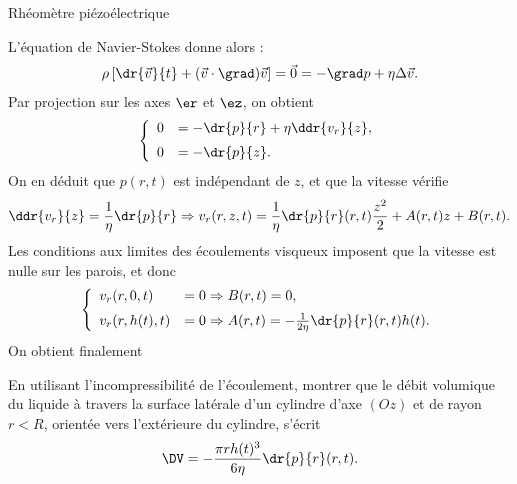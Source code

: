 \begin{exo}[PC][3][TD]{Rhéomètre piézoélectrique}
\begin{quest}
{L'équation de Navier-Stokes donne alors :
$$
\rho \left[ \dr{\Vec{v}}{t} + (\Vec{v} \cdot \grad) \Vec{v} \right] = \Vec{0} =  -\grad p + \eta \Delta \Vec{v}.
$$
Par projection sur les axes $\er$ et $\ez$, on obtient
$$
\left\{
\begin{array}{ll}
  0 & = -\dr{p}{r} + \eta \ddr{v_r}{z}, \\[2mm]
  0 & = -\dr{p}{z}. \\
\end{array}
\right.
$$
On en déduit que $p(r,t)$ est indépendant de $z$, et que la vitesse vérifie
$$
\ddr{v_r}{z} = \frac{1}{\eta} \dr{p}{r} \Rightarrow v_r(r,z,t) = \frac{1}{\eta} \dr{p}{r}(r,t) \frac{z^2}{2} + A(r,t) z + B(r,t).
$$
Les conditions aux limites des écoulements visqueux imposent que la vitesse est nulle sur les parois, et donc
$$
  \left\{
\begin{array}{ll}
    v_r(r,0,t) & = 0 \Rightarrow B(r,t) = 0, \\[2mm]
    v_r(r,h(t),t) & = 0 \Rightarrow A(r,t) = -\frac{1}{2\eta} \dr{p}{r}(r,t) h(t).
\end{array}
\right.
$$
On obtient finalement
}
\item En utilisant l'incompressibilité de l'écoulement, montrer que le débit volumique du liquide à travers la surface latérale d’un cylindre d'axe $(Oz)$ et de rayon $r < R$, orientée vers l'extérieure du cylindre, s'écrit 
\begin{equation}
\DV=-\frac{\pi r h(t)^3}{6\eta}\dr{p}{r}(r,t).
\end{equation}



\end{quest}
\end{exo}
